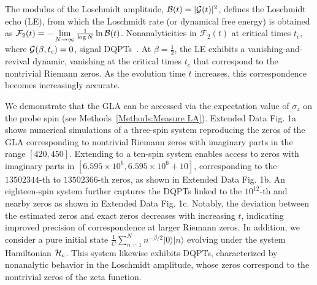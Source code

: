 \documentclass[aps,pra,twocolumn,superscriptaddress,preprintnumbers,amsmath,amssymb]{revtex4-2}
\begin{document}
The modulus of the Loschmidt amplitude, ${\cal B}(t) = |{\cal G}(t)|^2$, defines the Loschmidt echo (LE), from which the Loschmidt rate (or dynamical free energy) is obtained as 
$\mathcal{F}_2(t) = -\textstyle\lim\limits_{ N \to \infty} \frac{1}{\log N} \ln {\cal B}(t)$. 
Nonanalyticities in $\mathcal{F}_2(t)$ at critical times $t_c$, where ${\cal G}(\beta,t_c)=0$, signal DQPTs~\cite{heyl2013dynamical,heyl2017dynamical}. 
At $\beta=\tfrac{1}{2}$,  the LE exhibits a %
vanishing-and-revival dynamic, vanishing at the critical times $t_c$ that correspond to the nontrivial Riemann zeros. 
As the evolution time $t$ increases, this correspondence becomes increasingly accurate. 


We demonstrate that the GLA can be accessed via the expectation value of $\sigma_z$ on the probe spin (see Methods~\ref{Methods:Measure LA}).  Extended Data Fig. 1a shows numerical simulations of a three-spin system  reproducing the zeros of the GLA corresponding to nontrivial Riemann zeros with imaginary parts in the range $[420,450]$. Extending to a ten-spin system enables access to zeros with imaginary parts in $[6.595 \times 10^6,6.595 \times 10^6 + 10]$, corresponding to the $\num{13502344}$-th to $\num{13502366}$-th zeros, as shown in  Extended Data Fig. 1b. An eighteen-spin system further captures the DQPTs linked to the $10^{12}$-th and nearby zeros as shown in  Extended Data Fig. 1c. Notably, the deviation between the estimated zeros and exact zeros decreases with increasing $t$, indicating improved precision of correspondence at larger Riemann zeros. In addition, we consider a pure initial state $\frac{1}{C}\sum_{n=1}^{N} n^{-\beta/2}|0\rangle|n\rangle$ evolving under the system Hamiltonian $\mathcal{H}_{\rm c}$. This system likewise exhibits DQPTs, characterized by nonanalytic behavior in the  Loschmidt amplitude, whose zeros correspond to the nontrivial zeros of the zeta function. 
\end{document}
